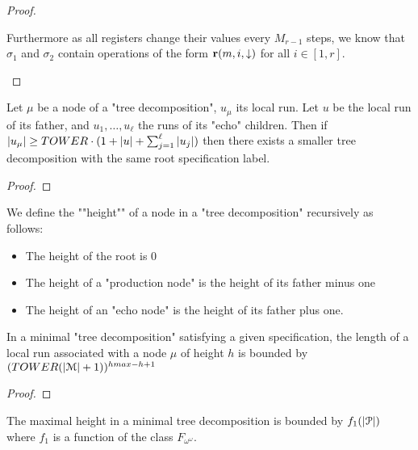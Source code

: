 \begin{proof}
\begin{itemize}
		Furthermore as all registers change their values every $M_{r-1}$ steps, we know that $\sigma_1$ and $\sigma_2$ contain operations of the form $\textbf{r}(m, i, \downarrow)$ for all $i \in [1,r]$.   
	\end{itemize}
\end{proof}
\fi

\begin{lemma}
	Let $\mu$ be a node of a "tree decomposition", $u_\mu$ its local run.
	Let $u$ be the local run of its father, and $u_1, \ldots, u_\ell$ the runs of its "echo" children.
	Then if $|u_\mu| \geq TOWER \cdot (1+ |u|+ \sum_{j=1}^{\ell} |u_j|)$ then there exists a smaller tree decomposition with the same root specification label.
\end{lemma}

\begin{proof}
\end{proof}

\begin{definition}
	We define the ""height"" of a node in a "tree decomposition" recursively as follows:
	\begin{itemize}
		\item The height of the root is $0$
		
		\item The height of a "production node" is the height of its father minus one
		
		\item The height of an "echo node" is the height of its father plus one.
	\end{itemize}
\end{definition}

\begin{lemma}
	\label{lem:bound-length-at-height-h}
	In a minimal "tree decomposition" satisfying a given specification, the length of a local run associated with a node $\mu$ of height $h$ is bounded by $(TOWER (|\mathcal{M}|+1))^{hmax-h+1}$
\end{lemma}

\begin{proof}
\end{proof}

\begin{lemma}
	\label{lem:bound-max-height}
	The maximal height in a minimal tree decomposition is bounded by $f_1(|\mathcal{P}|)$ where $f_1$ is a function of the class $F_{\omega^\omega}$.
\end{lemma}


